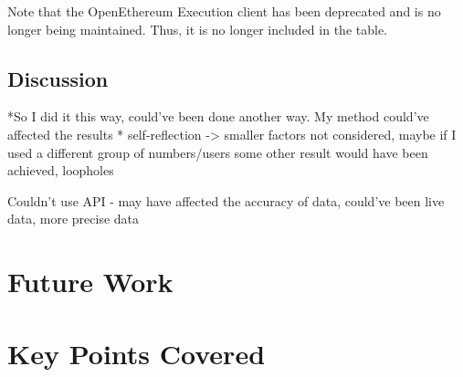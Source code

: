 \begin{table}[!htb]
    \centering

    \caption{An updated table of client diversity within Ethereum Mainnet network, data recorded on 27-Mar 23. Updates the table from report \cite{CryptoCarbonRatingsInstitute2022TheNetwork} }
  \label{Table:tabsubex}
\end{table}

Note that the OpenEthereum Execution client has been deprecated and is no longer being maintained. Thus, it is no longer included in the table.

\subsection{Discussion}
*So I did it this way, could've been done another way. My method could've affected the results
* self-reflection -> smaller factors not considered, maybe if I used a different group of numbers/users some other result would have been achieved, loopholes


Couldn't use API - may have affected the accuracy of data, could've been live data, more precise data




\section{Future Work}
\section{Key Points Covered}
